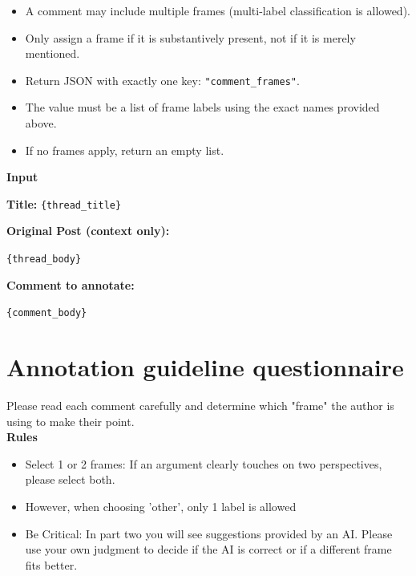 \documentclass[
10pt, %
a4paper, %
oneside, %
headinclude,footinclude, %
] {book}%
\begin{document}
\begin{tcolorbox}[
    colback=gray!5,
    colframe=black!75,
    title=Prompt Used for LLM Frame Annotation,
    sharp corners,
    boxrule=0.5pt
]
\begin{itemize}
    \item A comment may include multiple frames (multi-label classification is allowed).
    \item Only assign a frame if it is substantively present, not if it is merely mentioned.
    \item Return JSON with exactly one key: \texttt{"comment\_frames"}.
    \item The value must be a list of frame labels using the exact names provided above.
    \item If no frames apply, return an empty list.
\end{itemize}

\vspace{0.5em}

\textbf{Input}

\textbf{Title:} \texttt{\{thread\_title\}}

\textbf{Original Post (context only):}

\texttt{\{thread\_body\}}

\textbf{Comment to annotate:}

\texttt{\{comment\_body\}}

\end{tcolorbox}

\section{Annotation guideline questionnaire}
\label{sec:guidelines_questionnaire}

 Please read each comment carefully and determine which "frame" the author is using to make their point.  \\

\textbf{Rules}

\begin{itemize}
\item Select 1 or 2 frames: If an argument clearly touches on two perspectives, please select both.

\item However, when choosing 'other', only 1 label is allowed

\item Be Critical: In part two you will see suggestions provided by an AI. Please use your own judgment to decide if the AI is correct or if a different frame fits better.

\end{itemize}
\end{document}
